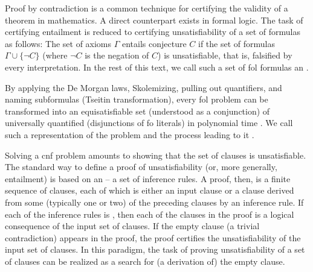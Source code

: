 Proof by contradiction is a common technique for certifying the validity of a theorem in mathematics.
A direct counterpart exists in formal logic.
The task of certifying
entailment is reduced to
certifying
unsatisfiability of a set of formulas as follows:
The set of axioms $\Gamma$ entails conjecture $C$ if the set of formulas $\Gamma \cup \{\lnot C\}$ (where $\lnot C$ is the negation of $C$) is unsatisfiable, that is, falsified by every interpretation.
In the rest of this text, we call such a set of \gls{fol} formulas an .


By applying
the De Morgan laws,
Skolemizing,
pulling out quantifiers, and
naming subformulas (Tseitin transformation),
every \gls{fol} problem can be transformed into an equisatisfiable set (understood as a conjunction) of universally quantified  (disjunctions of \gls{fo} literals) in polynomial time \cite{DBLP:books/el/RV01/NonnengartW01}.
We call such a representation of the problem 
and the process leading to it .

Solving a \gls{cnf} problem amounts to showing that the set of clauses is unsatisfiable.
The standard way to define a proof of unsatisfiability (or, more generally, entailment) is based on an  -- a set of inference rules.
A proof, then, is a finite sequence of clauses,
each of which is either an input clause or a clause derived from some (typically one or two) of the preceding clauses by an inference rule.
If each of the inference rules is ,
then each of the clauses in the proof is a logical consequence of the input set of clauses.
If the empty clause (a trivial contradiction) appears in the proof,
the proof certifies the unsatisfiability of the input set of clauses.
In this paradigm, the task of proving unsatisfiability of a set of clauses can be realized as a search for (a derivation of) the empty clause.

